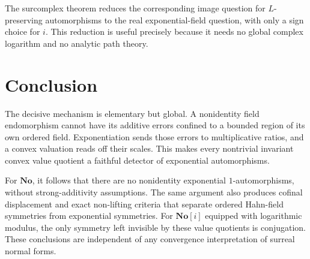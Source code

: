 \documentclass[11pt]{article}
\theoremstyle{definition}
\theoremstyle{remark}
\newcommand{\No}{\mathbf{No}}
\numberwithin{equation}{section}
\begin{document}
The surcomplex theorem reduces the corresponding image question for
$L$-preserving automorphisms to the real exponential-field question, with
only a sign choice for $i$. This reduction is useful precisely because it
needs no global complex logarithm and no analytic path theory.

\section{Conclusion}

The decisive mechanism is elementary but global. A nonidentity field
endomorphism cannot have its additive errors confined to a bounded
region of its own ordered field. Exponentiation sends those errors to
multiplicative ratios, and a convex valuation reads off their scales.
This makes every nontrivial invariant convex value quotient a faithful
detector of exponential automorphisms.

For $\No$, it follows that there are no nonidentity exponential
$1$-automorphisms, without strong-additivity assumptions. The same argument
also produces cofinal displacement and exact non-lifting criteria that
separate ordered Hahn-field symmetries from exponential symmetries.
For $\No[i]$ equipped with logarithmic modulus, the only symmetry left
invisible by these value quotients is conjugation. These conclusions are
independent of any convergence interpretation of surreal normal forms.
\end{document}
